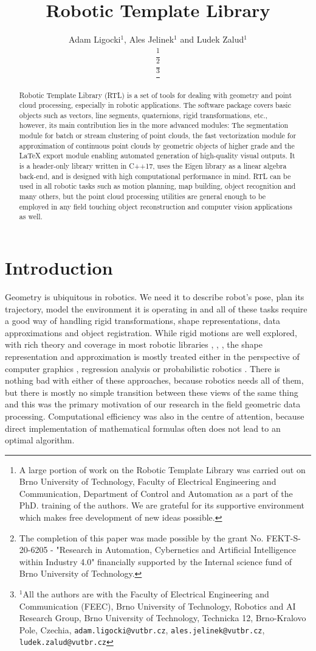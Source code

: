 \documentclass[
    letterpaper, 
    10 pt, 
    conference,
    table,
]{ieeeconf}
\title{\LARGE \bf
    Robotic Template Library
}
\author{Adam Ligocki$^{1}$, Ales Jelinek$^{1}$ and Ludek Zalud$^{1}$
    
    \thanks{A large portion of work on the Robotic Template Library was carried out on Brno University of Technology, Faculty of Electrical Engineering and Communication, Department of Control and Automation as a part of the PhD. training of the authors. We are grateful for its supportive environment which makes free development of new ideas possible.}
    
    \thanks{The completion of this paper was made possible by the grant No. FEKT-S-20-6205 - "Research in Automation, Cybernetics and Artificial Intelligence within Industry 4.0" financially supported by the Internal science fund of Brno University of Technology.}
    
    \thanks{$^{1}$All the authors are with the Faculty of Electrical Engineering and Communication (FEEC), Brno University of Technology, 
            Robotics and AI Research Group, 
            Brno University of Technology, Technicka 12, Brno-Kralovo Pole, Czechia,
            {\tt\small adam.ligocki@vutbr.cz}, 
            {\tt\small ales.jelinek@vutbr.cz}, 
            {\tt\small ludek.zalud@vutbr.cz}}
}
\begin{document}

\maketitle
\thispagestyle{empty}
\pagestyle{empty}

\begin{abstract}
Robotic Template Library (RTL) is a set of tools for dealing with geometry and point cloud processing, especially in robotic applications. The software package covers basic objects such as vectors, line segments, quaternions, rigid transformations, etc., however, its main contribution lies in the more advanced modules: The segmentation module for batch or stream clustering of point clouds, the fast vectorization module for approximation of continuous point clouds by geometric objects of higher grade and the LaTeX export module enabling automated generation of high-quality visual outputs. It is a header-only library written in C++17, uses the Eigen library as a linear algebra back-end, and is designed with high computational performance in mind. RTL can be used in all robotic tasks such as motion planning, map building, object recognition and many others, but the point cloud processing utilities are general enough to be employed in any field touching object reconstruction and computer vision applications as well.
\end{abstract}


\section*{Introduction}
Geometry is ubiquitous in robotics. We need it to describe robot's pose, plan its trajectory, model the environment it is operating in and all of these tasks require a good way of handling rigid transformations, shape representations, data approximations and object registration. While rigid motions are well explored, with rich theory \cite{Blanco2010} and coverage in most robotic libraries \cite{ros}, \cite{pcl}, \cite{Claraco2020}, the shape representation and approximation is mostly treated either in the perspective of computer graphics \cite{Bellocchio2013}, regression analysis \cite{Deming2011} or probabilistic robotics \cite{Thrun2005}. There is nothing bad with either of these approaches, because robotics needs all of them, but there is mostly no simple transition between these views of the same thing \cite{Cadena2016} and this was the primary motivation of our research in the field geometric data processing. Computational efficiency was also in the centre of attention, because direct implementation of mathematical formulas often does not lead to an optimal algorithm.
\end{document}
